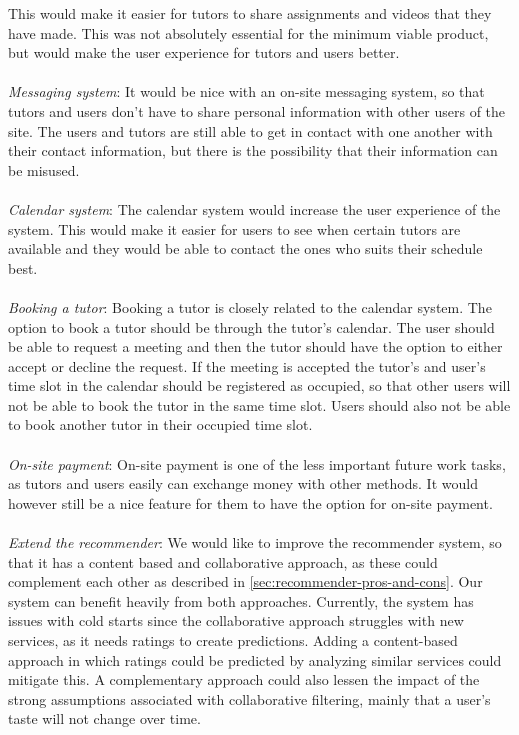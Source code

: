 This would make it easier for tutors to share assignments and videos that they have made. 
This was not absolutely essential for the minimum viable product, but would make the user experience for tutors and users better.
\\\\
\textit{Messaging system}: 
It would be nice with an on-site messaging system, so that tutors and users don't have to share personal information with other users of the site.
The users and tutors are still able to get in contact with one another with their contact information, but there is the possibility that their information can be misused.
\\\\
\textit{Calendar system}:
The calendar system would increase the user experience of the system. 
This would make it easier for users to see when certain tutors are available and they would be able to contact the ones who suits their schedule best.
\\\\
\textit{Booking a tutor}:
Booking a tutor is closely related to the calendar system.
The option to book a tutor should be through the tutor's calendar. 
The user should be able to request a meeting and then the tutor should have the option to either accept or decline the request.
If the meeting is accepted the tutor's and user's time slot in the calendar should be registered as occupied, so that other users will not be able to book the tutor in the same time slot.
Users should also not be able to book another tutor in their occupied time slot.
\\\\
\textit{On-site payment}:
On-site payment is one of the less important future work tasks, as tutors and users easily can exchange money with other methods.
It would however still be a nice feature for them to have the option for on-site payment.
\\\\
\textit{Extend the recommender}:
We would like to improve the recommender system, so that it has a content based and collaborative approach, as these could complement each other as described in \autoref{sec:recommender-pros-and-cons}.
Our system can benefit heavily from both approaches.
Currently, the system has issues with cold starts since the collaborative approach struggles with new services, as it needs ratings to create predictions.
Adding a content-based approach in which ratings could be predicted by analyzing similar services could mitigate this.
A complementary approach could also lessen the impact of the strong assumptions associated with collaborative filtering, mainly that a user's taste will not change over time.
